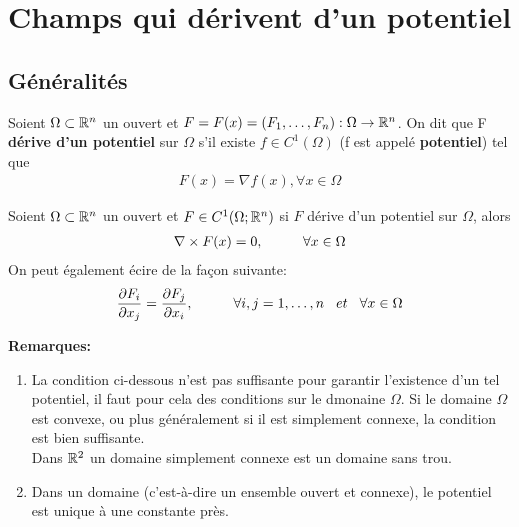 \chapter[Champs qui dérivent d'un potentiel]{Champs qui dérivent d'un potentiel}

\section{Généralités}

\begin{myDefinition}
	Soient $\Omega \subset \mathbb{R}^n$ un ouvert et $F = F(x) = (F_{1},\dots,F_n):\Omega\rightarrow\mathbb{R}^n$. On dit que F {\bf dérive d'un potentiel} sur $\Omega$ s'il existe $f\in C^1(\Omega)$ (f est appelé {\bf potentiel}) tel que
	\begin{eqnarray*}
		F(x)= \nabla f(x), \forall x\in \Omega
	\end{eqnarray*}
\end{myDefinition}

\begin{myTheorem}
	Soient $\Omega \subset \mathbb{R}^n$ un ouvert et $F\in C^1(\Omega;\mathbb{R}^n)$ si $F$ dérive d'un potentiel sur $\Omega$, alors 
	\begin{eqnarray*}
		\nabla \times F(x)=0, \hspace{10 mm}\forall x\in \Omega
	\end{eqnarray*}
	On peut également écire de la façon suivante:
	\begin{eqnarray*}
		\frac{\partial F_i}{\partial x_j}=\frac{\partial F_j}{\partial x_i}, \hspace{10 mm}\forall i, j=1,\dots,n \hspace{3 mm}et\hspace{3 mm}\forall x\in \Omega
	\end{eqnarray*}
	
	{\bf Remarques: }
	\begin{enumerate}
		\item La condition ci-dessous n'est pas suffisante pour garantir l'existence d'un tel potentiel, il faut pour cela des conditions sur le dmonaine $\Omega$. Si le domaine $\Omega$ est convexe, ou plus généralement si il est simplement connexe, la condition est bien suffisante.
		\\
		Dans $\mathbb{R}^2$ un domaine simplement connexe est un domaine sans trou.
		\item Dans un domaine (c'est-à-dire un ensemble ouvert et connexe), le potentiel est unique à une constante près.
	\end{enumerate}
\end{myTheorem}


